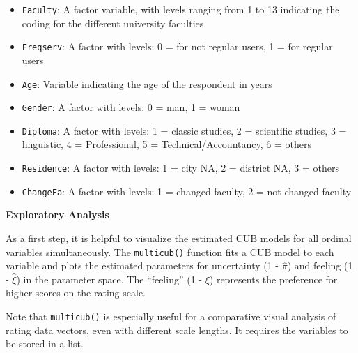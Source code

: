 \documentclass[
  letterpaper,
  DIV=11,
  numbers=noendperiod]{scrartcl}
\begin{document}
\begin{itemize}
\item
  \texttt{Faculty}: A factor variable, with levels ranging from 1 to 13
  indicating the coding for the different university faculties
\item
  \texttt{Freqserv}: A factor with levels: 0 = for not regular users, 1
  = for regular users
\item
  \texttt{Age}: Variable indicating the age of the respondent in years
\item
  \texttt{Gender}: A factor with levels: 0 = man, 1 = woman
\item
  \texttt{Diploma}: A factor with levels: 1 = classic studies, 2 =
  scientific studies, 3 = linguistic, 4 = Professional, 5 =
  Technical/Accountancy, 6 = others
\item
  \texttt{Residence}: A factor with levels: 1 = city NA, 2 = district
  NA, 3 = others
\item
  \texttt{ChangeFa}: A factor with levels: 1 = changed faculty, 2 = not
  changed faculty
\end{itemize}

\textbf{Exploratory Analysis}

As a first step, it is helpful to visualize the estimated CUB models for
all ordinal variables simultaneously. The \texttt{multicub()} function
fits a CUB model to each variable and plots the estimated parameters for
uncertainty (1 - \(\hat{\pi}\)) and feeling (1 - \(\hat{\xi}\)) in the
parameter space. The ``feeling'' (1 - \(\xi\)) represents the preference
for higher scores on the rating scale.

Note that \texttt{multicub()} is especially useful for a comparative
visual analysis of rating data vectors, even with different scale
lengths. It requires the variables to be stored in a list.
\end{document}
